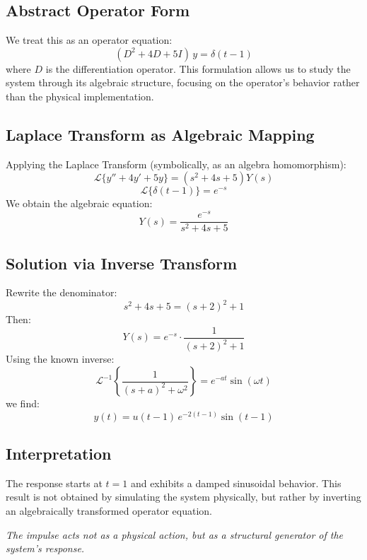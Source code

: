 \documentclass[12pt]{article}
\begin{document}
	\vspace{1em}
	
	\subsection*{Abstract Operator Form}
	
	We treat this as an operator equation:
	\[
	(D^2 + 4D + 5I)\,y = \delta(t - 1)
	\]
	where $D$ is the differentiation operator. This formulation allows us to study the system through its algebraic structure, focusing on the operator's behavior rather than the physical implementation.
	
	\vspace{1em}
	\subsection*{Laplace Transform as Algebraic Mapping}
	
	Applying the Laplace Transform (symbolically, as an algebra homomorphism):
	\[
	\mathcal{L}\{y'' + 4y' + 5y\} = (s^2 + 4s + 5)Y(s)
	\]
	\[
	\mathcal{L}\{\delta(t - 1)\} = e^{-s}
	\]
	We obtain the algebraic equation:
	\[
	Y(s) = \frac{e^{-s}}{s^2 + 4s + 5}
	\]
	
	\vspace{1em}
	\subsection*{Solution via Inverse Transform}
	
	Rewrite the denominator:
	\[
	s^2 + 4s + 5 = (s + 2)^2 + 1
	\]
	Then:
	\[
	Y(s) = e^{-s} \cdot \frac{1}{(s + 2)^2 + 1}
	\]
	Using the known inverse:
	\[
	\mathcal{L}^{-1} \left\{ \frac{1}{(s + a)^2 + \omega^2} \right\} = e^{-at} \sin(\omega t)
	\]
	we find:
	\[
	y(t) = u(t - 1)\, e^{-2(t - 1)} \sin(t - 1)
	\]
	
	\vspace{1em}
	\subsection*{Interpretation}
	
	The response starts at $t = 1$ and exhibits a damped sinusoidal behavior. This result is not obtained by simulating the system physically, but rather by inverting an algebraically transformed operator equation.
	
	\begin{center}
		\emph{The impulse acts not as a physical action, but as a structural generator of the system's response.}
	\end{center}
	
\end{document}

